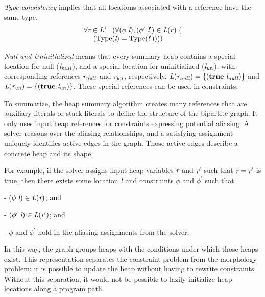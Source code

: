 \emph{Type consistency} implies that all locations associated with a reference have the same type.
\[
\begin{array}{l}
\forall \cfgnt{r} \in \cfgnt{L}^\leftarrow\ (\forall (\phi\ \cfgnt{l}),(\phi^\prime\ \cfgnt{l}^\prime) \in \cfgnt{L}(r)\ (\\
\ \ \ \ (\mathrm{Type}\lp\cfgnt{l}\rp = \mathrm{Type}\lp\cfgnt{l}^\prime\rp)))
\end{array}
\]

\emph{Null and Uninitialized} means that every summary heap contains 
a special location for null ($\emph{l}_\mathit{null}$), and a special
location for uninitialized
  ($\emph{l}_\mathit{un}$), with corresponding references
  $\emph{r}_\mathit{null}$ and
  $\emph{r}_\mathit{un}$, respectively. $\emph{L}(\emph{r}_\mathit{null}) =
  \{(\textbf{true}\ \emph{l}_\mathit{null})\}$ and
  $\emph{L}(\emph{r}_\mathit{un}) =
  \{(\textbf{true}\ \emph{l}_\mathit{un})\}$. These special references can be used in constraints.

To summarize, the heap summary algorithm creates
many references that are auxiliary literals or stack literals to
define the structure of the bipartite graph.  It only uses input heap
references for constraints expressing potential aliasing. A solver
reasons over the aliasing relationships, and a satisfying assignment
uniquely identifies active edges in the graph. Those active edges
describe a concrete heap and its shape.

For example, if the solver assigns input heap variables $\emph{r}$ and $\emph{r}^\prime$
such that $\emph{r} = \emph{r}^\prime$ is true, then there exists
some location $\emph{l}$ and constraints $\phi$ and $\phi^\prime$ such
that
\begin{compactitem}
\item[-] $(\phi\ \emph{l}) \in \emph{L}(\emph{r})$; and
\item[-] $\lp\phi^\prime\ \cfgnt{l}\rp \in \cfgnt{L}(\cfgnt{r}^\prime)$; and
\item[-] $\phi$ and $\phi^\prime$ hold in the aliasing assignments from the solver.
\end{compactitem}
In this way, the graph groups heaps with the conditions under which
those heaps exist. This representation separates the constraint
problem from the morphology problem: it is possible to update the heap
without having to rewrite constraints. Without this separation, it
would not be possible to lazily initialize heap locations along a
program path.

